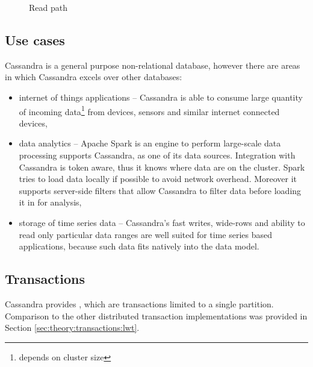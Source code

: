 \begin{figure}[H]
\caption{Read path}
  \label{fig:readPath}
\end{figure}
 
\subsection{Use cases}
Cassandra is a general purpose non-relational database, however there are areas in which Cassandra excels over other databases:
\begin{itemize}
\item internet of things applications -- Cassandra is able to consume large quantity of incoming data\footnote{depends on cluster size} from devices, sensors and similar internet connected devices,
\item data analytics -- Apache Spark is an engine to perform large-scale data processing \cite{ApacheSpark} supports Cassandra, as one of its data sources.
Integration with Cassandra is token aware, thus it knows where data are on the cluster. Spark tries to load data locally if possible to avoid network overhead. Moreover it supports server-side filters that allow Cassandra to filter data before loading it in for analysis,
\item storage of time series data -- Cassandra's fast writes, wide-rows and ability to read only particular data ranges are well suited for time series based applications, because such data fits natively into the data model.
\end{itemize} 

\subsection{Transactions}
Cassandra provides \lwt, which are transactions limited to a single partition.
Comparison to the other distributed transaction implementations was provided in Section \ref{sec:theory:transactions:lwt}.

